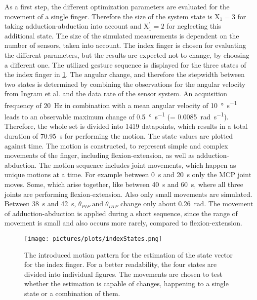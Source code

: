 As a first step, the different optimization parameters are evaluated for the movement of a single finger. Therefore the size of the system state is $ \mathrm{X}_{1} = 3 $ for taking adduction-abduction into account and $ \mathrm{X}^\prime_{1} = 2 $ for neglecting this additional state. The size of the simulated measurements is dependent on the number of sensors, taken into account. The index finger is chosen for evaluating the different parameters, but the results are expected not to change, by choosing a different one. The utilized gesture sequence is displayed for the three states of the index finger in \ref{fig:indexStates}. The angular change, and therefore the stepwidth between two states is determined by combining the observations for the angular velocity from Ingram et al. \cite{ingram2008statistics} and the data rate of the sensor system. An acquisition frequency of \SI{20}{\Hz} in combination with a mean angular velocity of \SI[per-mode=symbol]{10}{\degree \per \second} leads to an observable maximum change of \SI[per-mode=symbol]{0.5}{\degree \per \second} (= \SI[per-mode=symbol]{0.0085}{\radian \per \second}). Therefore, the whole set is divided into 1419 datapoints, which results in a total duration of \SI{70.95}{\second} for performing the motion. The state values are plotted against time. The motion is constructed, to represent simple and complex movements of the finger, including flexion-extension, as well as adduction-abduction. The motion sequence includes joint movements, which happen as unique motions at a time. For example between \SI{0}{\second} and \SI{20}{\second} only the \ac{MCP} joint moves. Some, which arise together, like between \SI{40}{\second} and \SI{60}{\second}, where all three joints are performing flexion-extension. Also only small movements are simulated. Between \SI{38}{\second} and \SI{42}{\second}, $ \theta_{PIP} \; \text{and} \; \theta_{DIP} $ change only about \SI{0.26}{\radian}. The movement of adduction-abduction is applied during a short sequence, since the range of movement is small and also occurs more rarely, compared to flexion-extension. 
\begin{figure}
\texttt{[image: pictures/plots/indexStates.png]}
\caption[Introduced movement pattern for index finger estimation]
{The introduced motion pattern for the estimation of the state vector for the index finger. For a better readability, the four states are divided into individual figures. The movements are chosen to test whether the estimation is capable of changes, happening to a single state or a combination of them.}
\label{fig:indexStates}
\end{figure}
